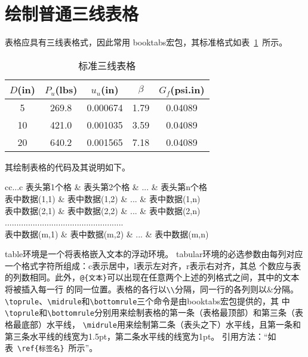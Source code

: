 \documentclass{cumcmthesis}
\begin{document}
\section{绘制普通三线表格}
表格应具有三线表格式，因此常用 booktabs宏包，其标准格式如表~\ref{tab001}~所示。
\begin{table}[!htbp]
\caption{标准三线表格}\label{tab001} \centering
\begin{tabular}{ccccc}
\toprule[1.5pt]
$D$(in) & $P_u$(lbs) & $u_u$(in) & $\beta$ & $G_f$(psi.in)\\
\midrule[1pt]
 5 & 269.8 & 0.000674 & 1.79 & 0.04089\\
10 & 421.0 & 0.001035 & 3.59 & 0.04089\\
20 & 640.2 & 0.001565 & 7.18 & 0.04089\\
\bottomrule[1.5pt]
\end{tabular}
\end{table}

其绘制表格的代码及其说明如下。
\begin{tcode}
\begin{table}[!htbp]
\caption[标签名]{中文标题}
\begin{tabular}{cc...c}
\toprule[1.5pt]
表头第1个格   & 表头第2个格   & ... & 表头第n个格  \\
\midrule[1pt]
表中数据(1,1) & 表中数据(1,2) & ... & 表中数据(1,n)\\
表中数据(2,1) & 表中数据(2,2) & ... & 表中数据(2,n)\\
...................................................\\
表中数据(m,1) & 表中数据(m,2) & ... & 表中数据(m,n)\\
\bottomrule[1.5pt]
\end{tabular}
\end{table}
\end{tcode}

\bigskip
table环境是一个将表格嵌入文本的浮动环境。
tabular环境的必选参数由每列对应一个格式字符所组成：c表示居中，l表示左对齐，r表示右对齐，其总
个数应与表的列数相同。此外，\verb|@{文本}|可以出现在任意两个上述的列格式之间，其中的文本将被插入每一行
的同一位置。表格的各行以\verb|\\|分隔，同一行的各列则以\&分隔。
\verb|\toprule|、\verb|\midrule|和\verb|\bottomrule|三个命令是由booktabs宏包提供的，其
中\verb|\toprule|和\verb|\bottomrule|分别用来绘制表格的第一条（表格最顶部）和第三条（表格最底部）水平线，
\verb|\midrule|用来绘制第二条（表头之下）水平线，且第一条和第三条水平线的线宽为1.5pt，第二条水平线的线宽为1pt。
引用方法：“如表~\verb|\ref{标签名}|~所示”。
\end{document}
